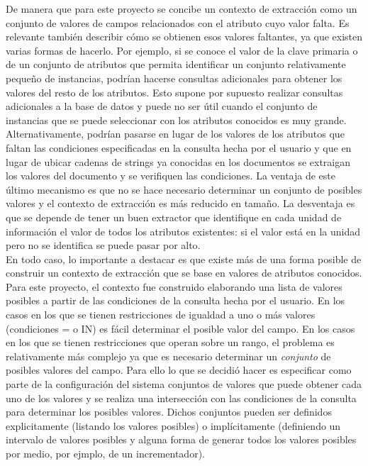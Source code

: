 De manera que para este proyecto se concibe un contexto de extracción como un conjunto de valores de campos relacionados con el atributo cuyo valor falta. Es relevante también describir cómo se obtienen esos valores faltantes, ya que existen varias formas de hacerlo. Por ejemplo, si se conoce el valor de la clave primaria o de un conjunto de atributos que permita identificar un conjunto relativamente pequeño de instancias, podrían hacerse consultas adicionales para obtener los valores del resto de los atributos. Esto supone por supuesto realizar consultas adicionales a la base de datos y puede no ser útil cuando el conjunto de instancias que se puede seleccionar con los atributos conocidos es muy grande. \\

Alternativamente, podrían pasarse en lugar de los valores de los atributos que faltan las condiciones especificadas en la consulta hecha por el usuario y que en lugar de ubicar cadenas de strings ya conocidas en los documentos se extraigan los valores del documento y se verifiquen las condiciones. La ventaja de este último mecanismo es que no se hace necesario determinar un conjunto de posibles valores y el contexto de extracción es más reducido en tamaño. La desventaja es que se depende de tener un buen extractor que identifique en cada unidad de información el valor de todos los atributos existentes: si el valor está en la unidad pero no se identifica se puede pasar por alto. \\ 

En todo caso, lo importante a destacar es que existe más de una forma posible de construir un contexto de extracción que se base en valores de atributos conocidos. Para este proyecto, el contexto fue construido elaborando una lista de valores posibles a partir de las condiciones de la consulta hecha por el usuario. En los casos en los que se tienen restricciones de igualdad a uno o más valores (condiciones = o IN) es fácil determinar el posible valor del campo. En los casos en los que se tienen restricciones que operan sobre un rango, el problema es relativamente más complejo ya que es necesario determinar un \emph{conjunto} de posibles valores del campo. Para ello lo que se decidió hacer es especificar como parte de la configuración del sistema conjuntos de valores que puede obtener cada uno de los valores y se realiza una intersección con las condiciones de la consulta para determinar los posibles valores. Dichos conjuntos pueden ser definidos explicitamente (listando los valores posibles) o implícitamente (definiendo un intervalo de valores posibles y alguna forma de generar todos los valores posibles por medio, por ejmplo, de un incrementador). \\


